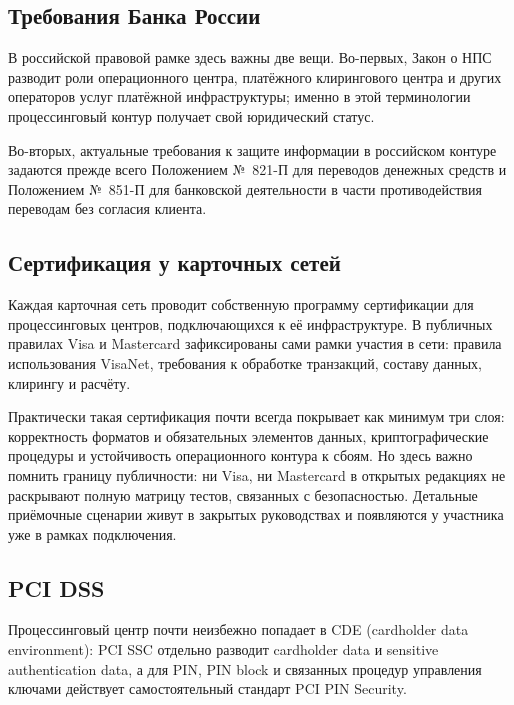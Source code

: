 \subsection*{Требования Банка России}

В российской правовой рамке здесь важны две вещи. Во-первых,
Закон о НПС разводит роли операционного центра, платёжного
клирингового центра и других операторов услуг платёжной
инфраструктуры; именно в этой терминологии процессинговый
контур получает свой юридический статус.~\cite{fz-161,cbr-ps-glossary}

Во-вторых, актуальные требования к защите информации
в российском контуре задаются прежде всего Положением
№~821-П для переводов денежных средств и Положением
№~851-П для банковской деятельности в части противодействия
переводам без согласия клиента.~\cite{cbr-821p,cbr-851p}

\subsection*{Сертификация у карточных сетей}

Каждая карточная сеть проводит собственную программу
сертификации для процессинговых центров, подключающихся
к её инфраструктуре. В публичных правилах Visa и Mastercard
зафиксированы сами рамки участия в сети: правила использования
VisaNet, требования к обработке транзакций, составу данных,
клирингу и расчёту.~\cite{visa-core-rules,mc-rules,mc-tpr}

Практически такая сертификация почти всегда покрывает
как минимум три слоя: корректность форматов и обязательных
элементов данных, криптографические процедуры и устойчивость
операционного контура к сбоям. Но здесь важно помнить
границу публичности: ни Visa, ни Mastercard в открытых
редакциях не раскрывают полную матрицу тестов, связанных
с безопасностью. Детальные приёмочные сценарии живут
в закрытых руководствах и появляются у участника уже
в рамках подключения.~\cite{visa-core-rules,mc-rules}

\subsection*{PCI DSS}

Процессинговый центр почти неизбежно попадает в CDE
(cardholder data environment): PCI SSC отдельно разводит
cardholder data и sensitive authentication data, а для PIN,
PIN block и связанных процедур управления ключами действует
самостоятельный стандарт PCI PIN Security.~\cite{pci-scoping-guidance,pci-faq-1335,pci-pin-security}

